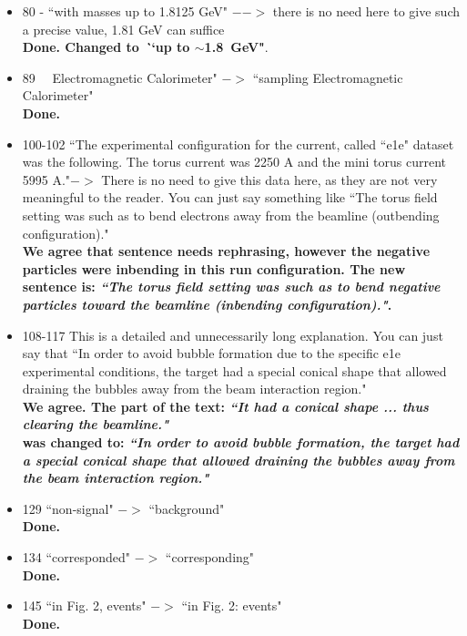 \documentclass[,superscriptaddress,showpacs,amssymb,amsmath,amsfonts,linenumbers,article]{revtex4-1}
\begin{document}
\begin{itemize}
\item 80 - ``with masses up to 1.8125 GeV" $-->$ there is no need here to give such a precise value, 1.81 GeV can suffice\\
{\bf Done. Changed to \textbf{\textit ``up to $\sim$1.8~GeV"}}.

\item 89 ~~Electromagnetic Calorimeter" $->$ ``sampling Electromagnetic Calorimeter"\\
{\bf Done.}

\item 100-102 ``The experimental configuration for the current, called ``e1e" dataset was the following. The torus current was 2250 A and the mini torus current 5995 A."$->$ There is no need to give this data here, as they are not very meaningful to the reader. You can just say something like ``The torus field setting was such as to bend electrons away from the beamline (outbending configuration)."\\
{\bf We agree that sentence needs rephrasing, however the negative particles were inbending in this run configuration. The new sentence is: \textbf{\textit{``The torus field setting was such as to bend negative particles toward the beamline (inbending configuration)."}}.
}

\item 108-117 This is a detailed and unnecessarily long explanation. You can just say that ``In order to avoid bubble formation due to the specific e1e experimental conditions, the target had a special conical shape that allowed draining the bubbles away from the beam interaction region."\\
{\bf We agree. The part of the text: \textbf{\textit{``It had a conical shape ... thus clearing the beamline."}}\\
was changed to: \textbf{\textit{``In order to avoid bubble formation, the target had a special conical shape that allowed draining the bubbles away from the beam interaction region."}}
}

\item 129 ``non-signal" $->$ ``background"\\
{\bf Done.}

\item 134 ``corresponded" $->$ ``corresponding"\\[0.5cm]
{\bf Done.}

\item 145 ``in Fig. 2, events" $->$ ``in Fig. 2: events"\\
{\bf Done.}


\end{itemize}
\end{document}
